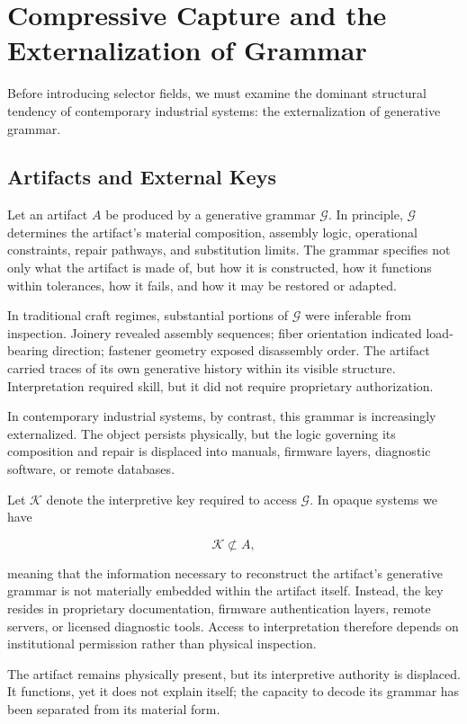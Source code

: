 \documentclass[11pt]{article}
\begin{document}
\section{Compressive Capture and the Externalization of Grammar}

Before introducing selector fields, we must examine the dominant
structural tendency of contemporary industrial systems:
the externalization of generative grammar.

\subsection{Artifacts and External Keys}

Let an artifact $A$ be produced by a generative grammar $\mathcal{G}$.
In principle, $\mathcal{G}$ determines the artifact’s material composition,
assembly logic, operational constraints, repair pathways, and substitution
limits. The grammar specifies not only what the artifact is made of,
but how it is constructed, how it functions within tolerances, how it
fails, and how it may be restored or adapted.

In traditional craft regimes, substantial portions of $\mathcal{G}$ were
inferable from inspection. Joinery revealed assembly sequences; fiber
orientation indicated load-bearing direction; fastener geometry exposed
disassembly order. The artifact carried traces of its own generative
history within its visible structure. Interpretation required skill,
but it did not require proprietary authorization.

In contemporary industrial systems, by contrast, this grammar is
increasingly externalized. The object persists physically, but the
logic governing its composition and repair is displaced into manuals,
firmware layers, diagnostic software, or remote databases. 

Let $\mathcal{K}$ denote the interpretive key required to access
$\mathcal{G}$. In opaque systems we have

\[
\mathcal{K} \not\subset A,
\]

meaning that the information necessary to reconstruct the artifact’s
generative grammar is not materially embedded within the artifact itself.
Instead, the key resides in proprietary documentation, firmware
authentication layers, remote servers, or licensed diagnostic tools.
Access to interpretation therefore depends on institutional permission
rather than physical inspection.

The artifact remains physically present, but its interpretive authority
is displaced. It functions, yet it does not explain itself; the capacity
to decode its grammar has been separated from its material form.
\end{document}
